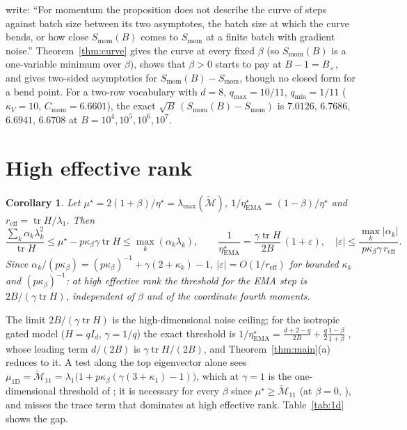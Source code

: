 \documentclass[11pt]{article}
\newtheorem{corollary}[theorem]{Corollary}
\newcommand{\tr}{\operatorname{tr}}
\begin{document}
\citet[after Proposition~H.15]{everett2026sparse} write: ``For momentum the proposition does not describe the curve of steps against batch size between its two asymptotes, the batch size at which the curve bends, or how close $S_{\mathrm{mom}}(B)$ comes to $S_{\mathrm{mom}}$ at a finite batch with gradient noise.'' Theorem~\ref{thm:curve} gives the curve at every fixed $\beta$ (so $S_{\mathrm{mom}}(B)$ is a one-variable minimum over $\beta$), shows that $\beta>0$ starts to pay at $B-1=B_\times$, and gives two-sided asymptotics for $S_{\mathrm{mom}}(B)-S_{\mathrm{mom}}$, though no closed form for a bend point. For a two-row vocabulary with $d=8$, $q_{\max}=10/11$, $q_{\min}=1/11$ ($\kappa_V=10$, $C_{\mathrm{mom}}=6.6601$), the exact $\sqrt B\,(S_{\mathrm{mom}}(B)-S_{\mathrm{mom}})$ is $7.0126$, $6.7686$, $6.6941$, $6.6708$ at $B=10^4,10^5,10^6,10^7$.

\section{High effective rank}

\begin{corollary}\label{cor:hd}
Let $\mu^\star=2(1+\beta)/\eta^\star=\lambda_{\max}(\widetilde{\mathcal M})$, $1/\eta^\star_{\mathrm{EMA}}=(1-\beta)/\eta^\star$ and $r_{\mathrm{eff}}=\tr H/\lambda_1$. Then
\[
\frac{\sum_k\alpha_k\lambda_k^2}{\tr H}\le\mu^\star-p\kappa_\beta\gamma\tr H\le\max_k(\alpha_k\lambda_k),\qquad \frac1{\eta^\star_{\mathrm{EMA}}}=\frac{\gamma\tr H}{2B}\,(1+\varepsilon),\quad |\varepsilon|\le\frac{\max_k|\alpha_k|}{p\kappa_\beta\gamma\,r_{\mathrm{eff}}}.
\]
Since $\alpha_k/(p\kappa_\beta)=(p\kappa_\beta)^{-1}+\gamma(2+\kappa_k)-1$, $|\varepsilon|=O(1/r_{\mathrm{eff}})$ for bounded $\kappa_k$ and $(p\kappa_\beta)^{-1}$: at high effective rank the threshold for the EMA step is $2B/(\gamma\tr H)$, independent of $\beta$ and of the coordinate fourth moments.
\end{corollary}

The limit $2B/(\gamma\tr H)$ is the high-dimensional noise ceiling; for the isotropic gated model ($H=qI_d$, $\gamma=1/q$) the exact threshold is $1/\eta^\star_{\mathrm{EMA}}=\frac{d+2-q}{2B}+\frac q2\frac{1-\beta}{1+\beta}$ \citep[eq.~(6)]{everett2026sparse}, whose leading term $d/(2B)$ is $\gamma\tr H/(2B)$, and Theorem~\ref{thm:main}(a) reduces to it. A test along the top eigenvector alone sees $\mu_{\mathrm{1D}}=\widetilde{\mathcal M}_{11}=\lambda_1\big(1+p\kappa_\beta(\gamma(3+\kappa_1)-1)\big)$, which at $\gamma=1$ is the one-dimensional threshold of \citet[eq.~(10)]{andreyev2026momentum}; it is necessary for every $\beta$ since $\mu^\star\ge\widetilde{\mathcal M}_{11}$ (at $\beta=0$, \citealp[Proposition~9]{mulayoff2024exact}), and misses the trace term that dominates at high effective rank. Table~\ref{tab:1d} shows the gap.
\end{document}
